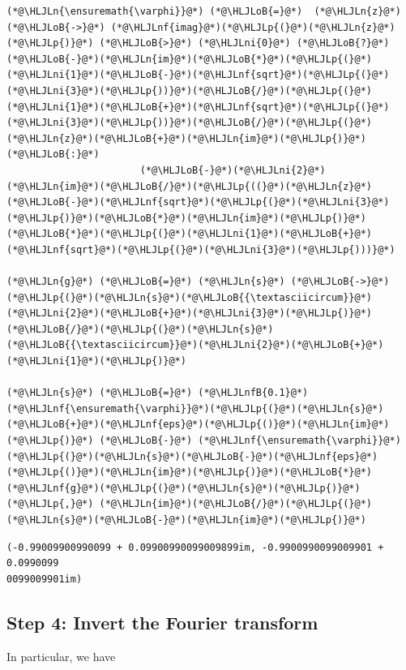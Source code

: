 \documentclass[12pt,a4paper]{article}
\newcommand{\HLJLn}[1]{#1}
\newcommand{\HLJLnf}[1]{\textcolor[RGB]{66,102,213}{#1}}
\newcommand{\HLJLnfB}[1]{\textcolor[RGB]{59,151,46}{#1}}
\newcommand{\HLJLni}[1]{\textcolor[RGB]{59,151,46}{#1}}
\newcommand{\HLJLoB}[1]{\textcolor[RGB]{102,102,102}{\textbf{#1}}}
\newcommand{\HLJLp}[1]{#1}
\begin{document}
\begin{lstlisting}
(*@\HLJLn{\ensuremath{\varphi}}@*) (*@\HLJLoB{=}@*)  (*@\HLJLn{z}@*) (*@\HLJLoB{->}@*) (*@\HLJLnf{imag}@*)(*@\HLJLp{(}@*)(*@\HLJLn{z}@*)(*@\HLJLp{)}@*) (*@\HLJLoB{>}@*) (*@\HLJLni{0}@*) (*@\HLJLoB{?}@*) (*@\HLJLoB{-}@*)(*@\HLJLn{im}@*)(*@\HLJLoB{*}@*)(*@\HLJLp{(}@*)(*@\HLJLni{1}@*)(*@\HLJLoB{-}@*)(*@\HLJLnf{sqrt}@*)(*@\HLJLp{(}@*)(*@\HLJLni{3}@*)(*@\HLJLp{))}@*)(*@\HLJLoB{/}@*)(*@\HLJLp{(}@*)(*@\HLJLni{1}@*)(*@\HLJLoB{+}@*)(*@\HLJLnf{sqrt}@*)(*@\HLJLp{(}@*)(*@\HLJLni{3}@*)(*@\HLJLp{))}@*)(*@\HLJLoB{/}@*)(*@\HLJLp{(}@*)(*@\HLJLn{z}@*)(*@\HLJLoB{+}@*)(*@\HLJLn{im}@*)(*@\HLJLp{)}@*) (*@\HLJLoB{:}@*)
                       (*@\HLJLoB{-}@*)(*@\HLJLni{2}@*)(*@\HLJLn{im}@*)(*@\HLJLoB{/}@*)(*@\HLJLp{((}@*)(*@\HLJLn{z}@*)(*@\HLJLoB{-}@*)(*@\HLJLnf{sqrt}@*)(*@\HLJLp{(}@*)(*@\HLJLni{3}@*)(*@\HLJLp{)}@*)(*@\HLJLoB{*}@*)(*@\HLJLn{im}@*)(*@\HLJLp{)}@*)(*@\HLJLoB{*}@*)(*@\HLJLp{(}@*)(*@\HLJLni{1}@*)(*@\HLJLoB{+}@*)(*@\HLJLnf{sqrt}@*)(*@\HLJLp{(}@*)(*@\HLJLni{3}@*)(*@\HLJLp{)))}@*)

(*@\HLJLn{g}@*) (*@\HLJLoB{=}@*) (*@\HLJLn{s}@*) (*@\HLJLoB{->}@*) (*@\HLJLp{(}@*)(*@\HLJLn{s}@*)(*@\HLJLoB{{\textasciicircum}}@*)(*@\HLJLni{2}@*)(*@\HLJLoB{+}@*)(*@\HLJLni{3}@*)(*@\HLJLp{)}@*)(*@\HLJLoB{/}@*)(*@\HLJLp{(}@*)(*@\HLJLn{s}@*)(*@\HLJLoB{{\textasciicircum}}@*)(*@\HLJLni{2}@*)(*@\HLJLoB{+}@*)(*@\HLJLni{1}@*)(*@\HLJLp{)}@*)

(*@\HLJLn{s}@*) (*@\HLJLoB{=}@*) (*@\HLJLnfB{0.1}@*)
(*@\HLJLnf{\ensuremath{\varphi}}@*)(*@\HLJLp{(}@*)(*@\HLJLn{s}@*)(*@\HLJLoB{+}@*)(*@\HLJLnf{eps}@*)(*@\HLJLp{()}@*)(*@\HLJLn{im}@*)(*@\HLJLp{)}@*) (*@\HLJLoB{-}@*) (*@\HLJLnf{\ensuremath{\varphi}}@*)(*@\HLJLp{(}@*)(*@\HLJLn{s}@*)(*@\HLJLoB{-}@*)(*@\HLJLnf{eps}@*)(*@\HLJLp{()}@*)(*@\HLJLn{im}@*)(*@\HLJLp{)}@*)(*@\HLJLoB{*}@*)(*@\HLJLnf{g}@*)(*@\HLJLp{(}@*)(*@\HLJLn{s}@*)(*@\HLJLp{)}@*) (*@\HLJLp{,}@*) (*@\HLJLn{im}@*)(*@\HLJLoB{/}@*)(*@\HLJLp{(}@*)(*@\HLJLn{s}@*)(*@\HLJLoB{-}@*)(*@\HLJLn{im}@*)(*@\HLJLp{)}@*)
\end{lstlisting}

\begin{lstlisting}
(-0.99009900990099 + 0.09900990099009899im, -0.9900990099009901 + 0.0990099
0099009901im)
\end{lstlisting}


\subsection{Step 4: Invert the Fourier transform}
In particular, we have
\end{document}

